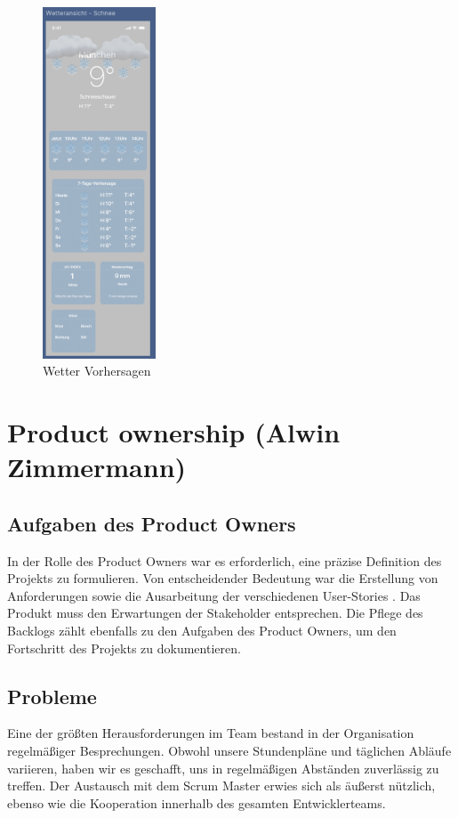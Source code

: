 \documentclass{article}
\begin{document}
\begin{figure}[htp]
\includegraphics[width=0.3\textwidth]{wetter_schnee.png}
\caption{Wetter Vorhersagen}
\end{figure}

\section{Product ownership \small{(Alwin Zimmermann)}}
\subsection{Aufgaben des Product Owners}
In der Rolle des Product Owners war es erforderlich, eine präzise Definition des Projekts zu formulieren. Von entscheidender Bedeutung war die Erstellung von Anforderungen sowie die Ausarbeitung der verschiedenen User-Stories . Das Produkt muss den Erwartungen der Stakeholder entsprechen. Die Pflege des Backlogs zählt ebenfalls zu den Aufgaben des Product Owners, um den Fortschritt des Projekts zu dokumentieren.

\subsection{Probleme}
Eine der größten Herausforderungen im Team bestand in der Organisation regelmäßiger Besprechungen. Obwohl unsere Stundenpläne und täglichen Abläufe variieren, haben wir es geschafft, uns in regelmäßigen Abständen zuverlässig zu treffen. Der Austausch mit dem Scrum Master erwies sich als äußerst nützlich, ebenso wie die Kooperation innerhalb des gesamten Entwicklerteams.
\end{document}
